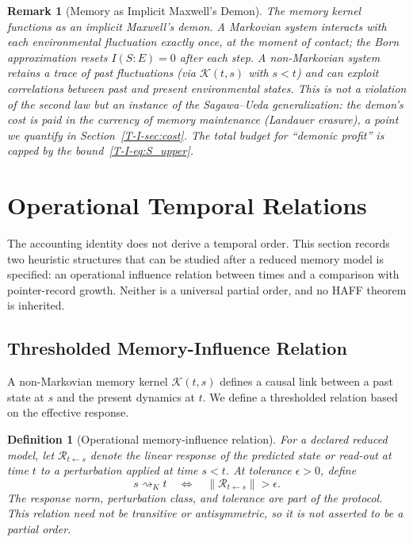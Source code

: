 \documentclass[12pt,a4paper,openany]{book}
\newtheorem{definition}[theorem]{Definition}
\newtheorem{remark}[theorem]{Remark}
\begin{document}
\begin{remark}[Memory as Implicit Maxwell's Demon]
\label{T-I-rem:demon}
The memory kernel functions as an \emph{implicit Maxwell's demon}.
A Markovian system interacts with each environmental fluctuation
exactly once, at the moment of contact; the Born approximation
resets $I(S{:}E) = 0$ after each step.
A non-Markovian system retains a trace of past fluctuations
(via $\mathcal{K}(t,s)$ with $s < t$) and can exploit
correlations between past and present environmental states.
This is not a violation of the second law but an instance of
the Sagawa--Ueda generalization: the demon's cost is paid in
the currency of memory maintenance (Landauer erasure), a point
we quantify in Section~\ref{T-I-sec:cost}.
The total budget for ``demonic profit'' is capped by the
bound~\eqref{T-I-eq:S_upper}.
\end{remark}

\section{Operational Temporal Relations}
\label{T-I-sec:arrow}

The accounting identity does not derive a temporal order.  This section
records two heuristic structures that can be studied after a reduced
memory model is specified: an operational influence relation between
times and a comparison with pointer-record growth.  Neither is a
universal partial order, and no HAFF theorem is inherited.

\subsection{Thresholded Memory-Influence Relation}

A non-Markovian memory kernel $\mathcal{K}(t,s)$ defines a
causal link between a past state at $s$ and the present dynamics
at $t$.
We define a thresholded relation based on the effective response.

\begin{definition}[Operational memory-influence relation]
\label{T-I-def:memory_order}
For a declared reduced model, let $\mathcal R_{t\leftarrow s}$ denote
the linear response of the predicted state or read-out at time $t$ to
a perturbation applied at time $s<t$.  At tolerance $\epsilon>0$, define
\begin{equation}
\label{T-I-eq:memory_order}
s\rightsquigarrow_K t
\quad\Longleftrightarrow\quad
\|\mathcal R_{t\leftarrow s}\|>\epsilon .
\end{equation}
The response norm, perturbation class, and tolerance are part of the
protocol.  This relation need not be transitive or antisymmetric, so it
is not asserted to be a partial order.
\end{definition}
\end{document}

